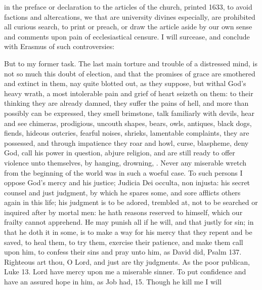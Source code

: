 {in the preface or declaration to the articles of the church, printed
1633, to avoid factions and altercations, we that are university
divines especially, are prohibited all curious search, to print or
preach, or draw the article aside by our own sense and comments upon
pain of ecclesiastical censure. I will surcease, and conclude with
Erasmus of such controversies: 

But to my former task. The last main torture and trouble of a
distressed mind, is not so much this doubt of election, and that the
promises of grace are smothered and extinct in them, nay quite blotted
out, as they suppose, but withal God's heavy wrath, a most intolerable
pain and grief of heart seizeth on them: to their thinking they are
already damned, they suffer the pains of hell, and more than possibly
can be expressed, they smell brimstone, talk familiarly with devils,
hear and see chimeras, prodigious, uncouth shapes, bears, owls,
antiques, black dogs, fiends, hideous outcries, fearful noises,
shrieks, lamentable complaints, they are possessed, and through
impatience they roar and howl, curse, blaspheme, deny God, call his
power in question, abjure religion, and are still ready to offer
violence unto themselves, by hanging, drowning, \etc{}. Never any miserable
wretch from the beginning of the world was in such a woeful case. To
such persons I oppose God's mercy and his justice; Judicia Dei occulta,
non injusta: his secret counsel and just judgment, by which he spares
some, and sore afflicts others again in this life; his judgment is to
be adored, trembled at, not to be searched or inquired after by mortal
men: he hath reasons reserved to himself, which our frailty cannot
apprehend. He may punish all if he will, and that justly for sin; in
that he doth it in some, is to make a way for his mercy that they
repent and be saved, to heal them, to try them, exercise their
patience, and make them call upon him, to confess their sins and pray
unto him, as David did, Psalm  137. Righteous art thou, O Lord,
and just are thy judgments. As the poor publican, Luke  13. Lord
have mercy upon me a miserable sinner. To put confidence and have an
assured hope in him, as Job had,  15. Though he kill me I will
}
